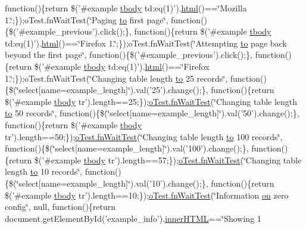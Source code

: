 \begin{DoxyCompactItemize}
function()\{return \$('\#example \hyperlink{core_8constructor_8js_a99b0542c7c50fe8757c55bf9dac5f3be}{tbody} td\+:eq(1)').\hyperlink{tinymce_8jquery_8dev_8js_ac2090bcf2ff968c0083d5de53a6544f3}{html}()==\char`\"{}Mozilla 1.\char`\"{};\});o\+Test.\+fn\+Wait\+Test(\char`\"{}Paging \hyperlink{jquery-ui_8js_af6086621f45baa2cf538f19e45d3c263}{to} first page\char`\"{}, function()\{\$('\#example\+\_\+previous').click();\}, function()\{return \$('\#example \hyperlink{core_8constructor_8js_a99b0542c7c50fe8757c55bf9dac5f3be}{tbody} td\+:eq(1)').\hyperlink{tinymce_8jquery_8dev_8js_ac2090bcf2ff968c0083d5de53a6544f3}{html}()==\char`\"{}Firefox 1.\char`\"{};\});o\+Test.\+fn\+Wait\+Test(\char`\"{}Attempting \hyperlink{jquery-ui_8js_af6086621f45baa2cf538f19e45d3c263}{to} page back beyond the first page\char`\"{}, function()\{\$('\#example\+\_\+previous').click();\}, function()\{return \$('\#example \hyperlink{core_8constructor_8js_a99b0542c7c50fe8757c55bf9dac5f3be}{tbody} td\+:eq(1)').\hyperlink{tinymce_8jquery_8dev_8js_ac2090bcf2ff968c0083d5de53a6544f3}{html}()==\char`\"{}Firefox 1.\char`\"{};\});o\+Test.\+fn\+Wait\+Test(\char`\"{}Changing table length \hyperlink{jquery-ui_8js_af6086621f45baa2cf538f19e45d3c263}{to} 25 records\char`\"{}, function()\{\$(\char`\"{}select\mbox{[}name=example\+\_\+length\mbox{]}\char`\"{}).val('25').change();\}, function()\{return \$('\#example \hyperlink{core_8constructor_8js_a99b0542c7c50fe8757c55bf9dac5f3be}{tbody} tr').length==25;\});\hyperlink{onhold_24__server-side_2__zero__config_8js_ab25c4d596771c0133cdc45178ce72c3d}{o\+Test.\+fn\+Wait\+Test}(\char`\"{}Changing table length \hyperlink{jquery-ui_8js_af6086621f45baa2cf538f19e45d3c263}{to} 50 records\char`\"{}, function()\{\$(\char`\"{}select\mbox{[}name=example\+\_\+length\mbox{]}\char`\"{}).val('50').change();\}, function()\{return \$('\#example \hyperlink{core_8constructor_8js_a99b0542c7c50fe8757c55bf9dac5f3be}{tbody} tr').length==50;\});\hyperlink{onhold_24__server-side_2__zero__config_8js_ab25c4d596771c0133cdc45178ce72c3d}{o\+Test.\+fn\+Wait\+Test}(\char`\"{}Changing table length \hyperlink{jquery-ui_8js_af6086621f45baa2cf538f19e45d3c263}{to} 100 records\char`\"{}, function()\{\$(\char`\"{}select\mbox{[}name=example\+\_\+length\mbox{]}\char`\"{}).val('100').change();\}, function()\{return \$('\#example \hyperlink{core_8constructor_8js_a99b0542c7c50fe8757c55bf9dac5f3be}{tbody} tr').length==57;\});\hyperlink{onhold_24__server-side_2__zero__config_8js_ab25c4d596771c0133cdc45178ce72c3d}{o\+Test.\+fn\+Wait\+Test}(\char`\"{}Changing table length \hyperlink{jquery-ui_8js_af6086621f45baa2cf538f19e45d3c263}{to} 10 records\char`\"{}, function()\{\$(\char`\"{}select\mbox{[}name=example\+\_\+length\mbox{]}\char`\"{}).val('10').change();\}, function()\{return \$('\#example \hyperlink{core_8constructor_8js_a99b0542c7c50fe8757c55bf9dac5f3be}{tbody} tr').length==10;\});\hyperlink{onhold_24__server-side_2__zero__config_8js_ab25c4d596771c0133cdc45178ce72c3d}{o\+Test.\+fn\+Wait\+Test}(\char`\"{}Information \hyperlink{fullpage_2plugin_8min_8js_a1cfa98b7fed2aaf9fee3b68dbb7f9497}{on} zero config\char`\"{}, null, function()\{return document.\+get\+Element\+By\+Id('example\+\_\+info').\hyperlink{jquery-ui_8js_a87f73c4f0391c1cf9fe60374a76d9a7b}{inner\+H\+T\+M\+L}==\char`\"{}Showing 1 
\end{DoxyCompactItemize}
